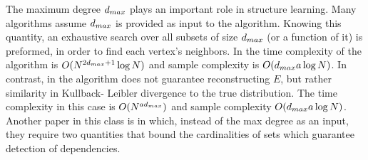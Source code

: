 The maximum degree $d_{max}$ plays an important role in structure learning.
Many algorithms \cite{bresler2008reconstruction, abbeel2006learning} assume $d_{max}$ is provided as input to the algorithm.
Knowing this quantity, an exhaustive search over all subsets of size $d_{max}$ (or a function of it) is preformed, in order to find each vertex's neighbors.
In \cite{bresler2008reconstruction} the time complexity of the algorithm is $O({N}^{2d_{max}+1}\log N)$ and sample complexity is $O(d_{max} a \log N)$.
In contrast, in \cite{abbeel2006learning} the algorithm does not guarantee reconstructing $E$, but rather similarity in Kullback- Leibler divergence to the true distribution.
The time complexity in this case is $O({N}^{a d_{max}})$ and sample complexity $O(d_{max} a \log {N})$. Another paper in this class is \cite{wu2013learning} in which, instead of the max degree as an input, they require two quantities that bound the cardinalities of sets which guarantee detection of dependencies. 

